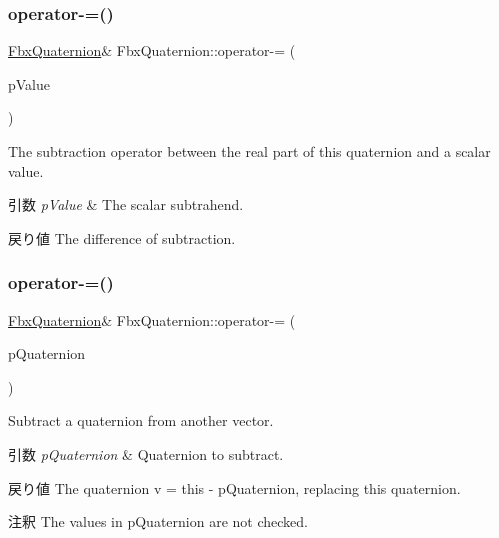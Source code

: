 \subsubsection{\texorpdfstring{operator-\/=()}{operator-=()}\hspace{0.1cm}{\footnotesize\ttfamily [1/2]}}
{\footnotesize\ttfamily \hyperlink{class_fbx_quaternion}{Fbx\+Quaternion}\& Fbx\+Quaternion\+::operator-\/= (\begin{DoxyParamCaption}\item[{double}]{p\+Value }\end{DoxyParamCaption})}

The subtraction operator between the real part of this quaternion and a scalar value. 
\begin{DoxyParams}{引数}
{\em p\+Value} & The scalar subtrahend. \\
\hline
\end{DoxyParams}
\begin{DoxyReturn}{戻り値}
The difference of subtraction. 
\end{DoxyReturn}
\mbox{\label{class_fbx_quaternion_a2166c06ff00f0a768b3be0c64ebc919a}} 
\subsubsection{\texorpdfstring{operator-\/=()}{operator-=()}\hspace{0.1cm}{\footnotesize\ttfamily [2/2]}}
{\footnotesize\ttfamily \hyperlink{class_fbx_quaternion}{Fbx\+Quaternion}\& Fbx\+Quaternion\+::operator-\/= (\begin{DoxyParamCaption}\item[{const \hyperlink{class_fbx_quaternion}{Fbx\+Quaternion} \&}]{p\+Quaternion }\end{DoxyParamCaption})}

Subtract a quaternion from another vector. 
\begin{DoxyParams}{引数}
{\em p\+Quaternion} & Quaternion to subtract. \\
\hline
\end{DoxyParams}
\begin{DoxyReturn}{戻り値}
The quaternion v\textquotesingle{} = this -\/ p\+Quaternion, replacing this quaternion. 
\end{DoxyReturn}
\begin{DoxyRemark}{注釈}
The values in p\+Quaternion are not checked. 
\end{DoxyRemark}
\mbox{\label{class_fbx_quaternion_abd6988e25ac58f06cefc5d4045099cbe}} 
